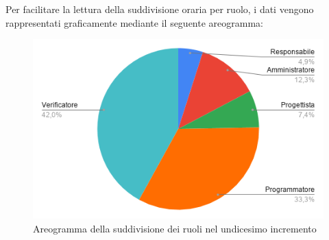 \documentclass[../piano-di-progetto.tex]{subfiles}
\begin{document}
  Per facilitare la lettura della suddivisione oraria per ruolo, i dati vengono rappresentati graficamente mediante il seguente areogramma:
  \begin{figure}[H]
    \centering
    \includegraphics[width=12cm]{img/ruoli-11-incr.png}
    \caption{Areogramma della suddivisione dei ruoli nel undicesimo incremento}
    \label{fig:ore-ruolo-progettazione}
  \end{figure}
\end{document}
